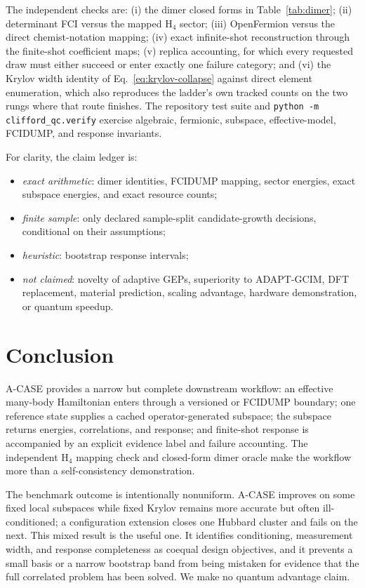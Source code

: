 \documentclass[aps,pra,reprint,superscriptaddress,nofootinbib,floatfix]{revtex4-2}
\begin{document}
The independent checks are: (i) the dimer closed forms in
Table~\ref{tab:dimer}; (ii) determinant FCI versus the mapped H$_4$ sector;
(iii) OpenFermion versus the direct chemist-notation mapping; (iv) exact
infinite-shot reconstruction through the finite-shot coefficient maps;
(v) replica accounting, for which every requested draw must either succeed or
enter exactly one failure category; and (vi) the Krylov width identity of
Eq.~\eqref{eq:krylov-collapse} against direct element enumeration, which also
reproduces the ladder's own tracked counts on the two rungs where that route
finishes.  The repository test suite and
\texttt{python -m clifford\_qc.verify} exercise algebraic, fermionic,
subspace, effective-model, FCIDUMP, and response invariants.

For clarity, the claim ledger is:
\begin{itemize}
 \item \emph{exact arithmetic}: dimer identities, FCIDUMP mapping, sector
 energies, exact subspace energies, and exact resource counts;
 \item \emph{finite sample}: only declared sample-split candidate-growth
 decisions, conditional on their assumptions;
 \item \emph{heuristic}: bootstrap response intervals;
 \item \emph{not claimed}: novelty of adaptive GEPs, superiority to
 ADAPT-GCIM, DFT replacement, material prediction, scaling advantage,
 hardware demonstration, or quantum speedup.
\end{itemize}

\section{Conclusion}
\label{sec:conclusion}

A-CASE provides a narrow but complete downstream workflow: an effective
many-body Hamiltonian enters through a versioned or FCIDUMP boundary; one
reference state supplies a cached operator-generated subspace; the subspace
returns energies, correlations, and response; and finite-shot response is
accompanied by an explicit evidence label and failure accounting.  The
independent H$_4$ mapping check and closed-form dimer oracle make the workflow
more than a self-consistency demonstration.

The benchmark outcome is intentionally nonuniform.  A-CASE improves on some
fixed local subspaces while fixed Krylov remains more accurate but often
ill-conditioned; a configuration extension closes one Hubbard cluster and
fails on the next.  This mixed result is the useful one.  It identifies
conditioning, measurement width, and response completeness as coequal design
objectives, and it prevents a small basis or a narrow bootstrap band from
being mistaken for evidence that the full correlated problem has been solved.
We make no quantum advantage claim.

\begingroup
\footnotesize

\endgroup
\end{document}
